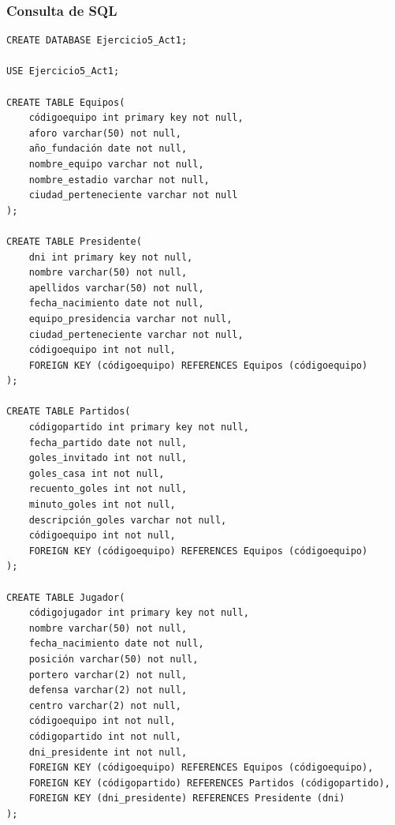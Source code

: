\documentclass[a4paper, 12pt]{article}
\begin{document}
\begin{justify}
        \subsubsection{Consulta de SQL}
\begin{verbatim}
CREATE DATABASE Ejercicio5_Act1;

USE Ejercicio5_Act1;

CREATE TABLE Equipos(
    códigoequipo int primary key not null,
    aforo varchar(50) not null,
    año_fundación date not null,
    nombre_equipo varchar not null,
    nombre_estadio varchar not null,
    ciudad_perteneciente varchar not null
);

CREATE TABLE Presidente(
    dni int primary key not null,
    nombre varchar(50) not null,
    apellidos varchar(50) not null,
    fecha_nacimiento date not null,
    equipo_presidencia varchar not null,
    ciudad_perteneciente varchar not null,
    códigoequipo int not null,
    FOREIGN KEY (códigoequipo) REFERENCES Equipos (códigoequipo)
);

CREATE TABLE Partidos(
	códigopartido int primary key not null,
    fecha_partido date not null,
    goles_invitado int not null,
    goles_casa int not null,
    recuento_goles int not null,
    minuto_goles int not null,
    descripción_goles varchar not null,
    códigoequipo int not null,
    FOREIGN KEY (códigoequipo) REFERENCES Equipos (códigoequipo)
);

CREATE TABLE Jugador(
    códigojugador int primary key not null,
    nombre varchar(50) not null,
    fecha_nacimiento date not null,
    posición varchar(50) not null,
    portero varchar(2) not null,
    defensa varchar(2) not null,
    centro varchar(2) not null,
    códigoequipo int not null,
    códigopartido int not null,
    dni_presidente int not null,
    FOREIGN KEY (códigoequipo) REFERENCES Equipos (códigoequipo),
    FOREIGN KEY (códigopartido) REFERENCES Partidos (códigopartido),
    FOREIGN KEY (dni_presidente) REFERENCES Presidente (dni)
);
\end{verbatim}

\end{justify}
\end{document}
